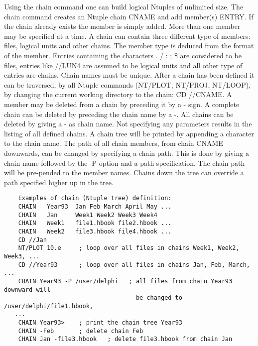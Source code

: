 \BEGARG
{}
\ENDARG

   \par
Using the chain command one can build logical Ntuples of unlimited size.  
   The chain command creates an Ntuple chain CNAME and add member(s) ENTRY.  
   If the chain already exists the member is simply added.  More than one 
   member may be specified at a time.  A chain can contain three different 
   type of members: files, logical units and other chains. The member type is 
   deduced from the format of the member. Entries containing the characters . 
   / : ; \$ are considered to be files, entries like //LUN4 are assumed to be 
   logical units and all other type of entries are chains. Chain names must be 
   unique.  After a chain has been defined it can be traversed, by all Ntuple 
   commands (NT/PLOT, NT/PROJ, NT/LOOP), by changing the current working 
   directory to the chain: CD //CNAME.  A member may be deleted from a chain 
   by preceding it by a - sign. A complete chain can be deleted by preceding 
   the chain name by a -. All chains can be deleted by giving a - as chain 
   name. Not specifying any parameters results in the listing of all defined 
   chains. A chain tree will be printed by appending a \KET{} character to the 
   chain name.  The path of all chain members, from chain CNAME downwards, can 
   be changed by specifying a chain path. This is done by giving a chain name 
   followed by the -P option and a path specification. The chain path will be 
   pre-pended to the member names. Chains down the tree can override a path 
   specified higher up in the tree.  
\begin{verbatim}
    Examples of chain (Ntuple tree) definition:
    CHAIN   Year93  Jan Feb March April May ...
    CHAIN   Jan     Week1 Week2 Week3 Week4
    CHAIN   Week1   file1.hbook file2.hbook ...
    CHAIN   Week2   file3.hbook file4.hbook ...
    CD //Jan
    NT/PLOT 10.e     ; loop over all files in chains Week1, Week2, Week3, ...
    CD //Year93      ; loop over all files in chains Jan, Feb, March, ...
    CHAIN Year93 -P /user/delphi   ; all files from chain Year93 downward will
                                     be changed to /user/delphi/file1.hbook, 
   ...
    CHAIN Year93>    ; print the chain tree Year93
    CHAIN -Feb       ; delete chain Feb
    CHAIN Jan -file3.hbook   ; delete file3.hbook from chain Jan
\end{verbatim}

